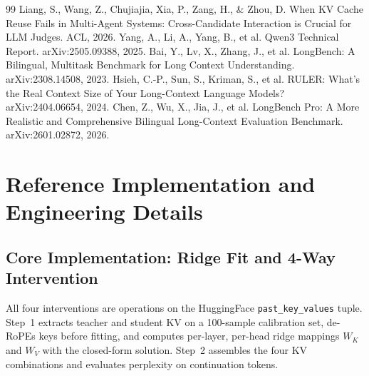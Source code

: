 \documentclass[10pt]{article}
\begin{document}
\begin{thebibliography}{99}
 Liang, S., Wang, Z., Chujiajia, Xia, P., Zang, H., \& Zhou, D. When KV Cache Reuse Fails in Multi-Agent Systems: Cross-Candidate Interaction is Crucial for LLM Judges. ACL, 2026.
 Yang, A., Li, A., Yang, B., et al. Qwen3 Technical Report. arXiv:2505.09388, 2025.
 Bai, Y., Lv, X., Zhang, J., et al. LongBench: A Bilingual, Multitask Benchmark for Long Context Understanding. arXiv:2308.14508, 2023.
 Hsieh, C.-P., Sun, S., Kriman, S., et al. RULER: What's the Real Context Size of Your Long-Context Language Models? arXiv:2404.06654, 2024.
 Chen, Z., Wu, X., Jia, J., et al. LongBench Pro: A More Realistic and Comprehensive Bilingual Long-Context Evaluation Benchmark. arXiv:2601.02872, 2026.
\end{thebibliography}

\appendix
\section{Reference Implementation and Engineering Details}
\subsection{Core Implementation: Ridge Fit and 4-Way Intervention}
All four interventions are operations on the HuggingFace \texttt{past\_key\_values} tuple. Step~1
extracts teacher and student KV on a 100-sample calibration set, de-RoPEs keys before fitting, and
computes per-layer, per-head ridge mappings $W_K$ and $W_V$ with the closed-form solution. Step~2
assembles the four KV combinations and evaluates perplexity on continuation tokens.
\end{document}
